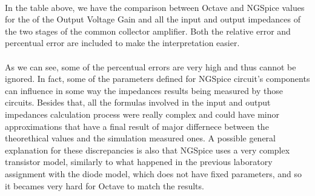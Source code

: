 \begin{center}
   \begin{table}[H]
\end{table}
\end{center}

\paragraph{}
In the table above, we have the comparison between Octave and NGSpice values for the of the Output Voltage Gain and all the input and output impedances of the two stages of the common collector amplifier. Both the relative error and percentual error are included to make the interpretation easier. 

\paragraph{}
As we can see, some of the percentual errors are very high and thus cannot be ignored. In fact, some of the parameters defined for NGSpice circuit's components can influence in some way the impedances results being measured by those circuits. Besides that, all the formulas involved in the input and output impedances calculation process were really complex and could have minor approximations that have a final result of major differnece between the theorethical values and the simulation measured ones. A possible general explanation for these discrepancies is also that NGSpice uses a very complex transistor model, similarly to what happened in the previous laboratory assignment with the diode model, which does not have fixed parameters, and so it becames very hard for Octave to match the results. 

